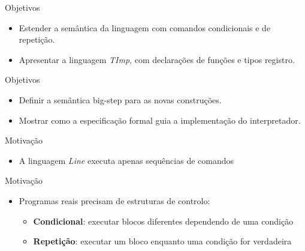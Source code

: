 \subtitle{\bf Aula 14 - A Linguagem While}
\begin{frame}[t,plain]
    \titlepage
\end{frame}

\begin{frame}{Objetivos}

    \begin{itemize}
        \item
        Estender a semântica da linguagem com comandos condicionais e de
        repetição.
        \item
        Apresentar a linguagem \emph{TImp}, com declarações de funções e tipos
        registro.
    \end{itemize}
\end{frame}

\begin{frame}{Objetivos}

    \begin{itemize}
        \item
        Definir a semântica big-step para as novas construções.
        \item
        Mostrar como a especificação formal guia a implementação do
        interpretador.
    \end{itemize}
\end{frame}



\begin{frame}{Motivação}

    \begin{itemize}

        \item
        A linguagem \emph{Line} executa apenas sequências de comandos
    \end{itemize}
\end{frame}

\begin{frame}{Motivação}

    \begin{itemize}

        \item
        Programas reais precisam de estruturas de controlo:

        \begin{itemize}

            \item
            \textbf{Condicional}: executar blocos diferentes dependendo de uma
            condição
            \item
            \textbf{Repetição}: executar um bloco enquanto uma condição for
            verdadeira
        \end{itemize}
    \end{itemize}
\end{frame}

